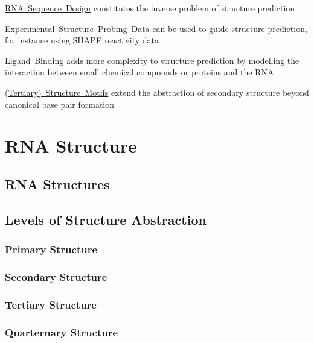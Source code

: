 \begin{DoxyItemize}
\item \mbox{\hyperlink{design}{R\+NA Sequence Design}} constitutes the inverse problem of structure prediction
\item \mbox{\hyperlink{structure_probing_data}{Experimental Structure Probing Data}} can be used to guide structure prediction, for instance using S\+H\+A\+PE reactivity data
\item \mbox{\hyperlink{ligand_binding}{Ligand Binding}} adds more complexity to structure prediction by modelling the interaction between small chemical compounds or proteins and the R\+NA
\item \mbox{\hyperlink{structure_motifs}{(Tertiary) Structure Motifs}} extend the abstraction of secondary structure beyond canonical base pair formation 
\end{DoxyItemize}\hypertarget{secondary_structures}{}\section{R\+NA Structure}\label{secondary_structures}
\hypertarget{secondary_structures_structures}{}\subsection{R\+N\+A Structures}\label{secondary_structures_structures}
\hypertarget{secondary_structures_structure_abstraction}{}\subsection{Levels of Structure Abstraction}\label{secondary_structures_structure_abstraction}
\hypertarget{secondary_structures_abstraction_primary}{}\subsubsection{Primary Structure}\label{secondary_structures_abstraction_primary}
\hypertarget{secondary_structures_abstraction_secondary}{}\subsubsection{Secondary Structure}\label{secondary_structures_abstraction_secondary}
\hypertarget{secondary_structures_abstraction_tertiary}{}\subsubsection{Tertiary Structure}\label{secondary_structures_abstraction_tertiary}
\hypertarget{secondary_structures_abstraction_quarternary}{}\subsubsection{Quarternary Structure}\label{secondary_structures_abstraction_quarternary}
